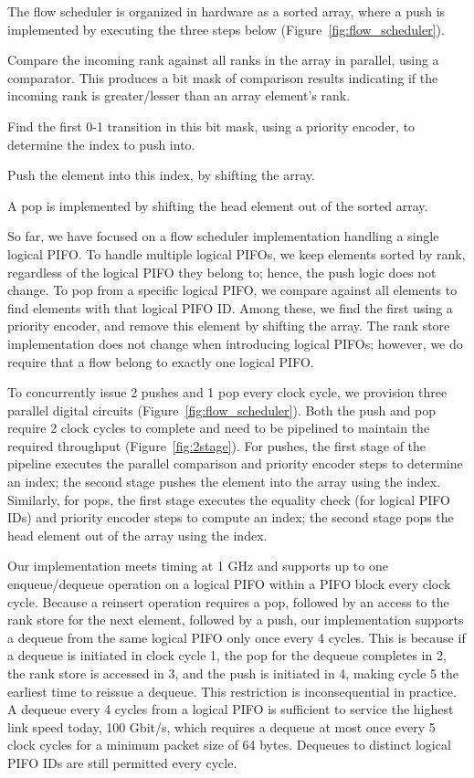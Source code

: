 The flow scheduler is organized in hardware as a sorted array, where a push is
implemented by executing the three steps below
(Figure~\ref{fig:flow_scheduler}).
\begin{CompactEnumerate}
\item Compare the incoming rank against all ranks in the array in parallel, using a comparator.
  This produces a bit mask of comparison results indicating if the incoming rank
  is greater/lesser than an array element's rank.
\item Find the first 0-1 transition in this bit mask, using a priority encoder,
  to determine the index to push into.
\item Push the element into this index, by shifting the array.
\end{CompactEnumerate}
A pop is implemented by shifting the head element out of the sorted array.

So far, we have focused on a flow scheduler implementation handling a single
logical PIFO. To handle multiple logical PIFOs, we keep elements sorted by
rank, regardless of the logical PIFO they belong to; hence, the push logic
does not change.  To pop from a specific logical PIFO, we compare against all
elements to find elements with that logical PIFO ID. Among these, we find the
first using a priority encoder, and remove this element by shifting the array.
The rank store implementation does not change when introducing logical PIFOs;
however, we do require that a flow belong to exactly one logical PIFO.

To concurrently issue 2 pushes and 1 pop every clock cycle, we provision three
parallel digital circuits (Figure~\ref{fig:flow_scheduler}). Both the
push and pop require 2 clock cycles to complete and need to be pipelined
 to maintain the required throughput (Figure~\ref{fig:2stage}). For pushes, the first stage of the pipeline executes
the parallel comparison and priority encoder steps to determine an index; the
second stage pushes the element into the array using the index.  Similarly, for
pops, the first stage executes the equality check (for logical PIFO IDs) and
priority encoder steps to compute an index; the second stage pops the head
element out of the array using the index.

Our implementation meets timing at 1 GHz and supports up to one enqueue/dequeue
operation on a logical PIFO within a PIFO block every clock cycle. Because a
reinsert operation requires a pop, followed by an access to the rank store for
the next element, followed by a push, our implementation supports a dequeue
from the same logical PIFO only once every 4 cycles. This is because if a dequeue is initiated
in clock cycle 1, the pop for the dequeue completes in 2, the rank store is accessed in 3, and
the push is initiated in 4, making cycle 5 the earliest time to reissue a dequeue.
This restriction is inconsequential in practice.  A dequeue every 4 cycles from
a logical PIFO is sufficient to service the highest link speed today, 100
Gbit/s, which requires a dequeue at most once every 5 clock cycles for a
minimum packet size of 64 bytes. Dequeues to distinct logical PIFO IDs are
still permitted every cycle.

